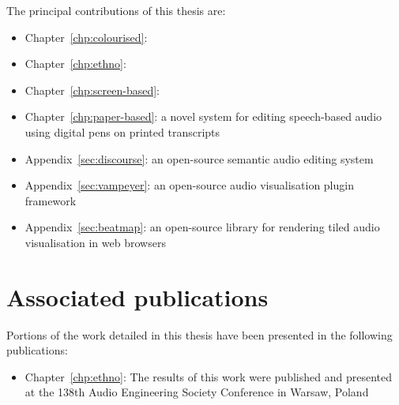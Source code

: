 The principal contributions of this thesis are:
\begin{itemize}
  \item Chapter~\ref{chp:colourised}: 
  \item Chapter~\ref{chp:ethno}: 
  \item Chapter~\ref{chp:screen-based}: 
  \item Chapter~\ref{chp:paper-based}: a novel system for editing speech-based audio using digital pens on printed transcripts
  \item Appendix~\ref{sec:discourse}: an open-source semantic audio editing system
  \item Appendix~\ref{sec:vampeyer}: an open-source audio visualisation plugin framework
  \item Appendix~\ref{sec:beatmap}: an open-source library for rendering tiled audio visualisation in web browsers
\end{itemize}

%

\section{Associated publications}\label{sec:intro/publications}

Portions of the work detailed in this thesis have been presented in the following publications:

\begin{itemize}
  \item Chapter~\ref{chp:ethno}: The results of this work were published and presented at the 138th Audio Engineering Society Conference in
    Warsaw, Poland \citep{Baume2015}
\end{itemize}
